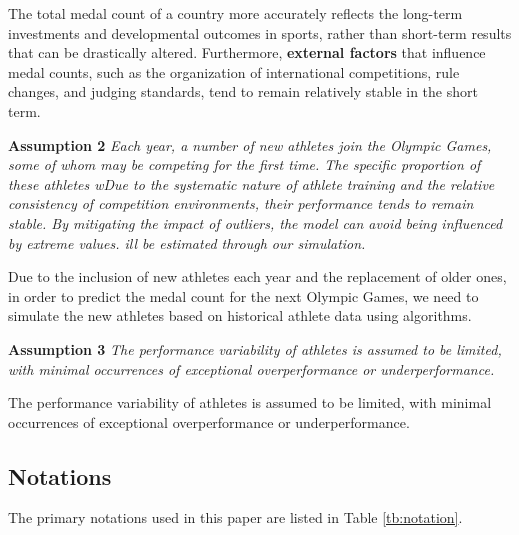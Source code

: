 \documentclass[12pt]{article}  %
\begin{document}
The total medal count of a country more accurately reflects the long-term investments and developmental outcomes in sports, rather than short-term results that can be drastically altered. Furthermore, \textbf{external factors} that influence medal counts, such as the organization of international competitions, rule changes, and judging standards, tend to remain relatively stable in the short term.


\textbf{Assumption 2 } \textit{Each year, a number of new athletes join the Olympic Games, some of whom may be competing for the first time. The specific proportion of these athletes wDue to the systematic nature of athlete training and the relative consistency of competition environments, their performance tends to remain stable. By mitigating the impact of outliers, the model can avoid being influenced by extreme values.  ill be estimated through our simulation. }

Due to the inclusion of new athletes each year and the replacement of older ones, in order to predict the medal count for the next Olympic Games, we need to simulate the new athletes based on historical athlete data using algorithms.


\textbf{Assumption 3} \textit{ The performance variability of athletes is assumed to be limited, with minimal occurrences of exceptional overperformance or underperformance.  }

The performance variability of athletes is assumed to be limited, with minimal occurrences of exceptional overperformance or underperformance.  


\subsection{Notations}

The primary notations used in this paper are listed in Table \ref{tb:notation}.

\end{document}
